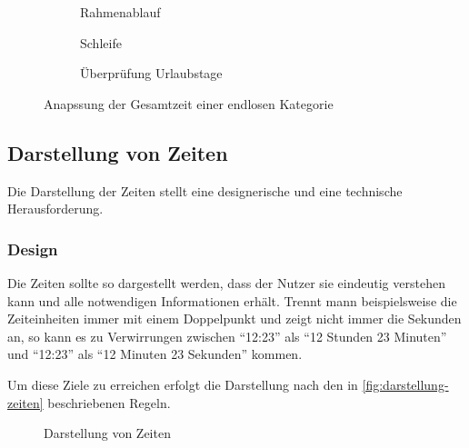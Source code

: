 \begin{figure}
    \begin{subfigure}{0.5\textwidth}
        \resizebox{0.9\linewidth}{!}{
            
        }
		\caption{Rahmenablauf}
	\end{subfigure}
	\begin{subfigure}{0.5\textwidth}
        \resizebox{0.9\linewidth}{!}{
            
        }
		\caption{Schleife}
    \end{subfigure}
    \begin{subfigure}{\textwidth}
        \resizebox{\linewidth}{!}{
            
        }
		\caption{Überprüfung Urlaubstage}
	\end{subfigure}
	\caption{Anapssung der Gesamtzeit einer endlosen Kategorie}
	\label{fig:anpassung-endlos}
\end{figure}


\subsection{Darstellung von Zeiten}
Die Darstellung der Zeiten stellt eine designerische und eine technische Herausforderung.

\subsubsection{Design}
Die Zeiten sollte so dargestellt werden,
dass der Nutzer sie eindeutig verstehen kann und alle notwendigen Informationen erhält.
Trennt mann beispielsweise die Zeiteinheiten immer mit einem Doppelpunkt und zeigt nicht immer die Sekunden an,
so kann es zu Verwirrungen zwischen \enquote{12:23} als \enquote{12 Stunden 23 Minuten}
und \enquote{12:23} als \enquote{12 Minuten 23 Sekunden} kommen.

Um diese Ziele zu erreichen erfolgt die Darstellung nach den in \autoref{fig:darstellung-zeiten} beschriebenen Regeln.

\begin{figure}[ht!]
    \centering
    \resizebox{\textwidth}{!}{
        
    }
    \caption{Darstellung von Zeiten}
    \label{fig:darstellung-zeiten}
\end{figure}


